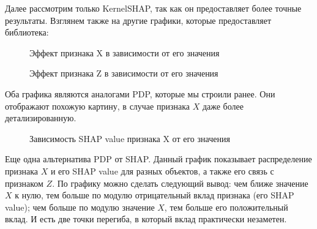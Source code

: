 Далее рассмотрим только KernelSHAP, так как он предоставляет более точные результаты. Взглянем также на другие графики, которые предоставляет библиотека:

\begin{figure}[h]
	\caption{Эффект признака X в зависимости от его значения}
\end{figure}
\vspace{-3mm}

\begin{figure}[h]
	\caption{Эффект признака Z в зависимости от его значения}
\end{figure}
\vspace{-3mm}

Оба графика являются аналогами PDP, которые мы строили ранее. Они отображают похожую картину, в случае признака $X$ даже более детализированную.

\begin{figure}[h]
	\caption{Зависимость SHAP value признака X от его значения}
\end{figure}
\vspace{-3mm}

Еще одна альтернатива PDP от SHAP. Данный график показывает распределение признака $X$ и его SHAP value для разных объектов, а также его связь с признаком $Z$. По графику можно сделать следующий вывод: чем ближе значение $X$ к нулю, тем больше по модулю отрицательный вклад признака (его SHAP value); чем больше по модулю значение $X$, тем больше его положительный вклад. И есть две точки перегиба, в который вклад практически незаметен.

